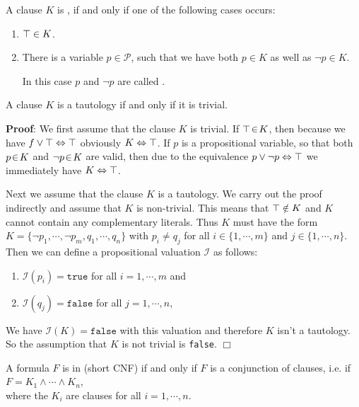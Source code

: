 \begin{Definition}
  A clause $K$ is , if and only if one of the following cases occurs:
  \begin{enumerate}
  \item $\top \in K$.
  \item There is a variable  $p \in \mathcal{P}$, such that we have both $p \in K$ as well as $\neg p \in K$.

        In this case $p$ and $\neg p$ are called  .
        \eox
\end{enumerate}
\end{Definition}

\begin{Proposition} \label{satz:trivial}
  A clause $K$ is a tautology if and only if it is trivial.
\end{Proposition}
\textbf{Proof}:  We first assume that the clause $K$ is trivial.
If $\top \!\in\! K$, then because we have
$f \vee \top \Leftrightarrow \top$
obviously $K \Leftrightarrow \top$.   If $p$ is a propositional variable, so that
both $p \!\in\! K$ and $\neg p \!\in\! K$ are valid, then due to the equivalence $p \vee
\neg p \Leftrightarrow \top$ we immediately have $K \Leftrightarrow \top$.

Next we assume that the clause $K$ is a tautology.  We carry out the proof
indirectly and assume that $K$ is non-trivial.  This means that $\top \notin K$ and
$K$ cannot contain any complementary literals.  Thus $K$ must have the form
\\[0.2cm]
\hspace*{1.3cm} 
$K = \{ \neg p_1, \cdots, \neg p_m, q_1, \cdots, q_n \}$ \quad with $p_i
\not= q_j$ for all $i \in \{ 1,\cdots,m\}$ and $j \in \{1, \cdots, n\}$.
\\[0.2cm]
Then we can define a propositional valuation $\mathcal{I}$ as follows:
\begin{enumerate}
\item $\mathcal{I}(p_i) = \texttt{true}$ for all $i = 1, \cdots, m$ and
\item $\mathcal{I}(q_j) = \texttt{false}$ for all $j = 1, \cdots, n$,
\end{enumerate}
We have $\mathcal{I}(K) = \texttt{false}$ with this valuation and therefore $K$ isn't a tautology.  So the
assumption that $K$ is not trivial is \texttt{false}. 
\hspace*{\fill}  $\Box$

\begin{Definition}  
  A formula $F$ is in  (short CNF)
  if and only if $F$ is a conjunction of clauses, i.e. if \\[0.2cm]
  \hspace*{1.3cm} $F = K_1 \wedge \cdots \wedge K_n$, \\[0.2cm]
  where the $K_i$ are clauses for all $i=1,\cdots,n$. \eox
\end{Definition}

